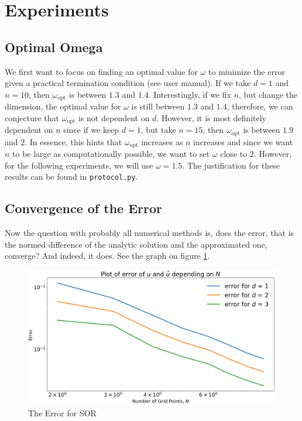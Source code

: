 \section{Experiments}
\subsection{Optimal Omega}

We first want to focus on finding an optimal value for \(\omega\) to minimize the error given a practical termination condition (see user manual). If we take \(d = 1\) and \(n = 10\), then \(\omega_{\text{opt}}\) is between \(1.3\) and \(1.4\). Interestingly, if we fix \(n\), but change the dimension, the optimal value for \(\omega\) is still between \(1.3\) and \(1.4\), therefore, we can conjecture that \(\omega_\text{opt}\) is not dependent on \(d\). However, it is most definitely dependent on \(n\) since if we keep \(d = 1\), but take \(n = 15\), then \(\omega_{\text{opt}}\) is between \(1.9\) and \(2\).
In essence, this hints that \(\omega_\text{opt}\) increases as \(n\) increases and since we want \(n\) to be large as computationally possible, we want to set \(\omega\) close to \(2\). However, for the following experiments, we will use \(\omega = 1.5\). The justification for these results can be found in \texttt{protocol.py}.

\subsection{Convergence of the Error}

Now the question with probably all numerical methods is, does the error, that is the normed difference of the analytic solution and the approximated one, converge? And indeed, it does. See the graph on figure \ref{fig:boat1}.

\begin{figure}[h]
	\includegraphics[width=\linewidth]{graphics/error_plot_sor.png}
	\caption{The Error for SOR}
	\label{fig:boat1}
\end{figure}

